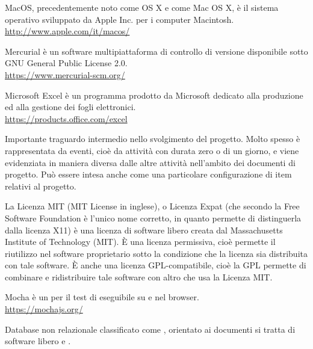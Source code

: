 MacOS, precedentemente noto come OS X e come Mac OS X, è il sistema operativo sviluppato da Apple Inc. per i computer Macintosh.\\
\url{http://www.apple.com/it/macos/}

Mercurial è un software multipiattaforma di controllo di versione disponibile sotto GNU General Public License 2.0.\\
\url{https://www.mercurial-scm.org/}

Microsoft Excel è un programma prodotto da Microsoft dedicato alla produzione ed alla gestione dei fogli elettronici.\\
\url{https://products.office.com/excel}

Importante traguardo intermedio nello svolgimento del progetto. Molto spesso è rappresentata da eventi, cioè da attività con durata zero o di un giorno, e viene evidenziata in maniera diversa dalle altre attività nell'ambito dei documenti di progetto. Può essere intesa anche come una particolare configurazione di item relativi al progetto.

La Licenza MIT (MIT License in inglese), o Licenza Expat (che secondo la Free Software Foundation è l'unico nome corretto, in quanto permette di distinguerla dalla licenza X11) è una licenza di software libero creata dal Massachusetts Institute of Technology (MIT). \`{E} una licenza permissiva, cioè permette il riutilizzo nel software proprietario sotto la condizione che la licenza sia distribuita con tale software. \`{E} anche una licenza GPL-compatibile, cioè la GPL permette di combinare e ridistribuire tale software con altro che usa la Licenza MIT.

Mocha è un  per il test di  eseguibile su  e nel browser.\\
\url{https://mochajs.org/}

Database non relazionale classificato come , orientato ai documenti si tratta di software libero e .
\clearpage